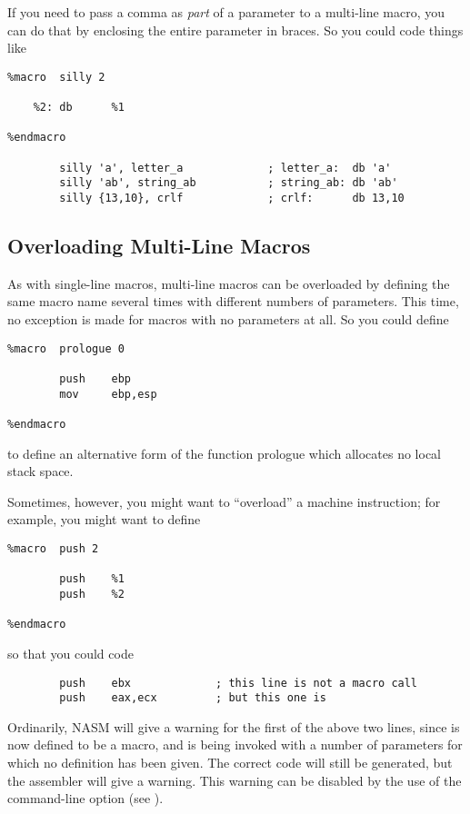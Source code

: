 If you need to pass a comma as \emph{part} of a parameter to a
multi-line macro, you can do that by enclosing the entire parameter
in braces. So you could code
things like

\begin{lstlisting}
%macro  silly 2

    %2: db      %1

%endmacro

        silly 'a', letter_a             ; letter_a:  db 'a'
        silly 'ab', string_ab           ; string_ab: db 'ab'
        silly {13,10}, crlf             ; crlf:      db 13,10
\end{lstlisting}

\subsection{Overloading Multi-Line Macros}
\label{subsec:mlmacover}

As with single-line macros, multi-line macros can be overloaded by
defining the same macro name several times with different numbers of
parameters. This time, no exception is made for macros with no
parameters at all. So you could define

\begin{lstlisting}
%macro  prologue 0

        push    ebp
        mov     ebp,esp

%endmacro
\end{lstlisting}

to define an alternative form of the function prologue which
allocates no local stack space.

Sometimes, however, you might want to ``overload'' a machine
instruction; for example, you might want to define

\begin{lstlisting}
%macro  push 2

        push    %1
        push    %2

%endmacro
\end{lstlisting}

so that you could code

\begin{lstlisting}
        push    ebx             ; this line is not a macro call
        push    eax,ecx         ; but this one is
\end{lstlisting}

Ordinarily, NASM will give a warning for the first of the above two
lines, since  is now defined to be a macro, and is being
invoked with a number of parameters for which no definition has been
given. The correct code will still be generated, but the assembler
will give a warning. This warning can be disabled by the use of the
 command-line option (see ).


